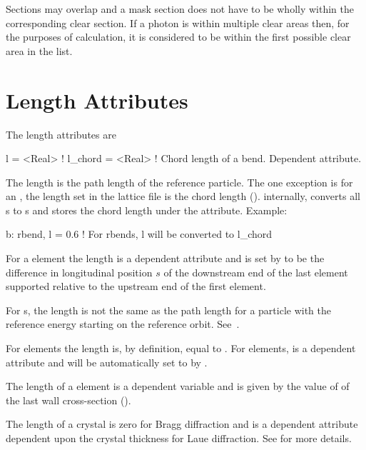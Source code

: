 Sections may overlap and a mask section does not have to be wholly
within the corresponding clear section. If a photon is within multiple
clear areas then, for the purposes of calculation, it is considered to
be within the first possible clear area in the list.

\section{Length Attributes}
\label{s:l}

The length attributes are
\begin{example}
  l       = <Real>  ! 
  l_chord = <Real>  ! Chord length of a bend. Dependent attribute.
\end{example}
The length  is the path length of the reference particle. The
one exception is for an , the length  set in the
lattice file is the chord length (). internally, \bmad
converts all s to s and stores the chord length
under the  attribute.
Example:
\begin{example}
  b: rbend, l = 0.6   ! For rbends, l will be converted to l_chord
\end{example}

For a  element the length  is a dependent attribute
and is set by \bmad to be the difference in longitudinal position $s$
of the downstream end of the last element supported relative to the
upstream end of the first element. 

For s, the length  is not the same as the
path length for a particle with the reference energy starting on the
reference orbit. See~.

For  elements the  length is, by definition, equal to
. For  elements,  is a dependent
attribute and will be automatically set to  by \bmad.

The length of a  element is a dependent variable and is
given by the value of  of the last wall cross-section
().

The length of a crystal is zero for Bragg diffraction and is a
dependent attribute dependent upon the crystal thickness for Laue
diffraction. See  for more details.

